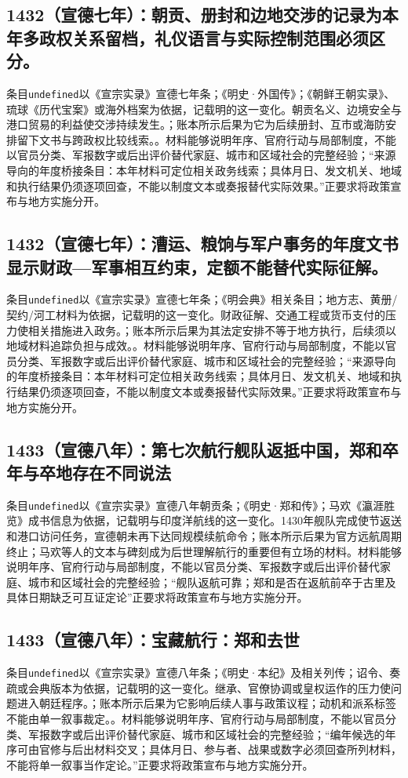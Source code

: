 \subsection{1432（宣德七年）：朝贡、册封和边地交涉的记录为本年多政权关系留档，礼仪语言与实际控制范围必须区分。}
条目\texttt{undefined}以《宣宗实录》宣德七年条；《明史·外国传》；《朝鲜王朝实录》、琉球《历代宝案》或海外档案为依据，记载明的这一变化。朝贡名义、边境安全与港口贸易的利益使交涉持续发生。；账本所示后果为它为后续册封、互市或海防安排留下文书与跨政权比较线索。。材料能够说明年序、官府行动与局部制度，不能以官员分类、军报数字或后出评价替代家庭、城市和区域社会的完整经验；“来源导向的年度桥接条目：本年材料可定位相关政务线索；具体月日、发文机关、地域和执行结果仍须逐项回查，不能以制度文本或奏报替代实际效果。”正要求将政策宣布与地方实施分开。

\subsection{1432（宣德七年）：漕运、粮饷与军户事务的年度文书显示财政—军事相互约束，定额不能替代实际征解。}
条目\texttt{undefined}以《宣宗实录》宣德七年条；《明会典》相关条目；地方志、黄册/契约/河工材料为依据，记载明的这一变化。财政征解、交通工程或货币支付的压力使相关措施进入政务。；账本所示后果为其法定安排不等于地方执行，后续须以地域材料追踪负担与成效。。材料能够说明年序、官府行动与局部制度，不能以官员分类、军报数字或后出评价替代家庭、城市和区域社会的完整经验；“来源导向的年度桥接条目：本年材料可定位相关政务线索；具体月日、发文机关、地域和执行结果仍须逐项回查，不能以制度文本或奏报替代实际效果。”正要求将政策宣布与地方实施分开。

\subsection{1433（宣德八年）：第七次航行舰队返抵中国，郑和卒年与卒地存在不同说法}
条目\texttt{undefined}以《宣宗实录》宣德八年朝贡条；《明史·郑和传》；马欢《瀛涯胜览》成书信息为依据，记载明与印度洋航线的这一变化。1430年舰队完成使节返送和港口访问任务，宣德朝未再下达同规模续航命令；账本所示后果为官方远航周期终止；马欢等人的文本与碑刻成为后世理解航行的重要但有立场的材料。材料能够说明年序、官府行动与局部制度，不能以官员分类、军报数字或后出评价替代家庭、城市和区域社会的完整经验；“舰队返航可靠；郑和是否在返航前卒于古里及具体日期缺乏可互证定论”正要求将政策宣布与地方实施分开。

\subsection{1433（宣德八年）：宝藏航行：郑和去世}
条目\texttt{undefined}以《宣宗实录》宣德八年条；《明史·本纪》及相关列传；诏令、奏疏或会典版本为依据，记载明的这一变化。继承、官僚协调或皇权运作的压力使问题进入朝廷程序。；账本所示后果为它影响后续人事与政策议程；动机和派系标签不能由单一叙事裁定。。材料能够说明年序、官府行动与局部制度，不能以官员分类、军报数字或后出评价替代家庭、城市和区域社会的完整经验；“编年候选的年序可由官修与后出材料交叉；具体月日、参与者、战果或数字必须回查所列材料，不能将单一叙事当作定论。”正要求将政策宣布与地方实施分开。

